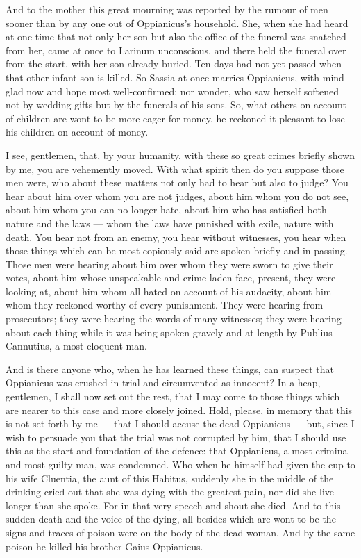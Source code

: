  And to the mother this great mourning was reported by the rumour of men sooner than by any one out of Oppianicus's household. She, when she had heard at one time that not only her son but also the office of the funeral was snatched from her, came at once to Larinum unconscious, and there held the funeral over from the start, with her son already buried. Ten days had not yet passed when that other infant son is killed. So Sassia at once marries Oppianicus, with mind glad now and hope most well-confirmed; nor wonder, who saw herself softened not by wedding gifts but by the funerals of his sons. So, what others on account of children are wont to be more eager for money, he reckoned it pleasant to lose his children on account of money.

 I see, gentlemen, that, by your humanity, with these so great crimes briefly shown by me, you are vehemently moved. With what spirit then do you suppose those men were, who about these matters not only had to hear but also to judge? You hear about him over whom you are not judges, about him whom you do not see, about him whom you can no longer hate, about him who has satisfied both nature and the laws --- whom the laws have punished with exile, nature with death. You hear not from an enemy, you hear without witnesses, you hear when those things which can be most copiously said are spoken briefly and in passing. Those men were hearing about him over whom they were sworn to give their votes, about him whose unspeakable and crime-laden face, present, they were looking at, about him whom all hated on account of his audacity, about him whom they reckoned worthy of every punishment. They were hearing from prosecutors; they were hearing the words of many witnesses; they were hearing about each thing while it was being spoken gravely and at length by Publius Cannutius, a most eloquent man.

 And is there anyone who, when he has learned these things, can suspect that Oppianicus was crushed in trial and circumvented as innocent? In a heap, gentlemen, I shall now set out the rest, that I may come to those things which are nearer to this case and more closely joined. Hold, please, in memory that this is not set forth by me --- that I should accuse the dead Oppianicus --- but, since I wish to persuade you that the trial was not corrupted by him, that I should use this as the start and foundation of the defence: that Oppianicus, a most criminal and most guilty man, was condemned. Who when he himself had given the cup to his wife Cluentia, the aunt of this Habitus, suddenly she in the middle of the drinking cried out that she was dying with the greatest pain, nor did she live longer than she spoke. For in that very speech and shout she died. And to this sudden death and the voice of the dying, all besides which are wont to be the signs and traces of poison were on the body of the dead woman. And by the same poison he killed his brother Gaius Oppianicus.

